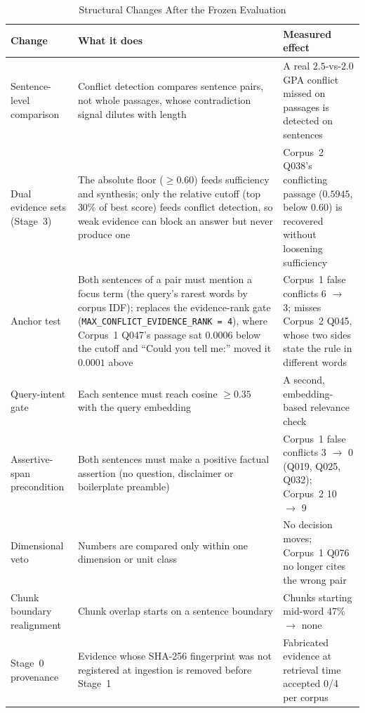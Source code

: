 \documentclass[conference]{IEEEtran}
\begin{document}
\begin{table}[t]
\caption{Structural Changes After the Frozen Evaluation}
\label{tab:changes}
\centering
\small
\begin{tabularx}{\textwidth}{@{}l X X@{}}
\toprule
Change & What it does & Measured effect \\
\midrule
Sentence-level comparison & Conflict detection compares sentence pairs, not whole passages, whose contradiction signal dilutes with length & A real $2.5$-vs-$2.0$ GPA conflict missed on passages is detected on sentences \\
Dual evidence sets (Stage~3) & The absolute floor ($\geq 0.60$) feeds sufficiency and synthesis; only the relative cutoff (top 30\% of best score) feeds conflict detection, so weak evidence can block an answer but never produce one & Corpus~2 Q038's conflicting passage ($0.5945$, below $0.60$) is recovered without loosening sufficiency \\
Anchor test & Both sentences of a pair must mention a focus term (the query's rarest words by corpus IDF); replaces the evidence-rank gate (\texttt{MAX\_CONFLICT\_EVIDENCE\_RANK\,=\,4}), where Corpus~1 Q047's passage sat $0.0006$ below the cutoff and ``Could you tell me:'' moved it $0.0001$ above & Corpus~1 false conflicts 6 $\to$ 3; misses Corpus~2 Q045, whose two sides state the rule in different words \\
Query-intent gate & Each sentence must reach cosine $\geq 0.35$ with the query embedding & A second, embedding-based relevance check \\
Assertive-span precondition & Both sentences must make a positive factual assertion (no question, disclaimer or boilerplate preamble) & Corpus~1 false conflicts 3 $\to$ 0 (Q019, Q025, Q032); Corpus~2 10 $\to$ 9 \\
Dimensional veto & Numbers are compared only within one dimension or unit class & No decision moves; Corpus~1 Q076 no longer cites the wrong pair \\
Chunk boundary realignment & Chunk overlap starts on a sentence boundary & Chunks starting mid-word 47\% $\to$ none \\
Stage~0 provenance & Evidence whose SHA-256 fingerprint was not registered at ingestion is removed before Stage~1 & Fabricated evidence at retrieval time accepted 0/4 per corpus \\
\bottomrule
\end{tabularx}
\end{table}
\end{document}

